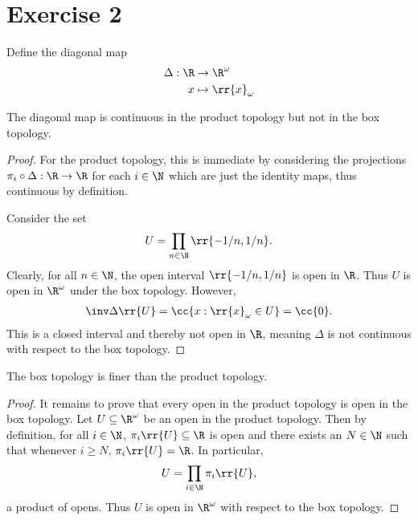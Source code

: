 \documentclass{article}
\begin{document}
\section*{Exercise 2}


Define the diagonal map
\begin{align*}
  \Delta:\R&\to\R^\omega \\
  x &\mapsto \rr{x}_{\omega}
\end{align*}

\begin{claim*}
  The diagonal map is continuous in the product topology but not in the box topology.
  \begin{proof}
    For the product topology, this is immediate by considering the projections $\pi_i\circ \Delta:\R\to\R$
    for each $i\in\N$ which are just the identity maps, thus continuous by definition.

    Consider the set
    \begin{align*}
      U=\prod_{n\in\N} \rr{-1/n, 1/n}.
    \end{align*}
    Clearly, for all $n\in\N$, the open interval $\rr{-1/n,1/n}$ is open in $\R$. Thus $U$
    is open in $\R^\omega$ under the box topology. However,
    \begin{align*}
      \inv\Delta\rr{U} = \cc{x : \rr{x}_{\omega} \in U} = \cc{0}.
    \end{align*}
    This is a closed interval and thereby not open in $\R$, meaning $\Delta$ is not continuous
    with respect to the box topology.
  \end{proof}
\end{claim*}

\begin{claim*}
  The box topology is finer than the product topology.
  \begin{proof}
    It remains to prove that every open in the product topology is open in the box topology.
    Let $U\subseteq\R^\omega$ be an open in the product topology. Then by definition, for all $i\in\N$,
    $\pi_i\rr{U}\subseteq\R$ is open and there exists an $N\in\N$ such that whenever $i\geq N$,
    $\pi_i\rr{U}=\R$. In particular,
    \begin{align*}
      U=\prod_{i\in\N} \pi_i\rr{U},
    \end{align*}
    a product of opens. Thus $U$ is open in $\R^\omega$ with respect to the box topology.
  \end{proof}
\end{claim*}
\end{document}

